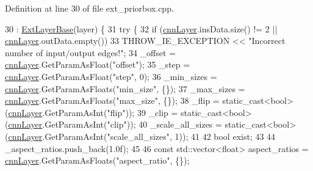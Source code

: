 Definition at line 30 of file ext\+\_\+priorbox.\+cpp.


\begin{DoxyCode}
30                                                 : \hyperlink{classInferenceEngine_1_1Extensions_1_1Cpu_1_1ExtLayerBase_affff0e8263ca26852ccf71d299d7b06a}{ExtLayerBase}(layer) \{
31         \textcolor{keywordflow}{try} \{
32             \textcolor{keywordflow}{if} (\hyperlink{classInferenceEngine_1_1Extensions_1_1Cpu_1_1ExtLayerBase_a1074cdccacb9e9ca6eec01bbc2f7ca4a}{cnnLayer}.insData.size() != 2 || \hyperlink{classInferenceEngine_1_1Extensions_1_1Cpu_1_1ExtLayerBase_a1074cdccacb9e9ca6eec01bbc2f7ca4a}{cnnLayer}.outData.empty())
33                 THROW\_IE\_EXCEPTION << \textcolor{stringliteral}{"Incorrect number of input/output edges!"};
34             \_offset = \hyperlink{classInferenceEngine_1_1Extensions_1_1Cpu_1_1ExtLayerBase_a1074cdccacb9e9ca6eec01bbc2f7ca4a}{cnnLayer}.GetParamAsFloat(\textcolor{stringliteral}{"offset"});
35             \_step = \hyperlink{classInferenceEngine_1_1Extensions_1_1Cpu_1_1ExtLayerBase_a1074cdccacb9e9ca6eec01bbc2f7ca4a}{cnnLayer}.GetParamAsFloat(\textcolor{stringliteral}{"step"}, 0);
36             \_min\_sizes = \hyperlink{classInferenceEngine_1_1Extensions_1_1Cpu_1_1ExtLayerBase_a1074cdccacb9e9ca6eec01bbc2f7ca4a}{cnnLayer}.GetParamAsFloats(\textcolor{stringliteral}{"min\_size"}, \{\});
37             \_max\_sizes = \hyperlink{classInferenceEngine_1_1Extensions_1_1Cpu_1_1ExtLayerBase_a1074cdccacb9e9ca6eec01bbc2f7ca4a}{cnnLayer}.GetParamAsFloats(\textcolor{stringliteral}{"max\_size"}, \{\});
38             \_flip = \textcolor{keyword}{static\_cast<}\textcolor{keywordtype}{bool}\textcolor{keyword}{>}(\hyperlink{classInferenceEngine_1_1Extensions_1_1Cpu_1_1ExtLayerBase_a1074cdccacb9e9ca6eec01bbc2f7ca4a}{cnnLayer}.GetParamAsInt(\textcolor{stringliteral}{"flip"}));
39             \_clip = \textcolor{keyword}{static\_cast<}\textcolor{keywordtype}{bool}\textcolor{keyword}{>}(\hyperlink{classInferenceEngine_1_1Extensions_1_1Cpu_1_1ExtLayerBase_a1074cdccacb9e9ca6eec01bbc2f7ca4a}{cnnLayer}.GetParamAsInt(\textcolor{stringliteral}{"clip"}));
40             \_scale\_all\_sizes = \textcolor{keyword}{static\_cast<}\textcolor{keywordtype}{bool}\textcolor{keyword}{>}(\hyperlink{classInferenceEngine_1_1Extensions_1_1Cpu_1_1ExtLayerBase_a1074cdccacb9e9ca6eec01bbc2f7ca4a}{cnnLayer}.GetParamAsInt(\textcolor{stringliteral}{"scale\_all\_sizes"}, 1));
41 
42             \textcolor{keywordtype}{bool} exist;
43 
44             \_aspect\_ratios.push\_back(1.0f);
45 
46             \textcolor{keyword}{const} std::vector<float> aspect\_ratios = \hyperlink{classInferenceEngine_1_1Extensions_1_1Cpu_1_1ExtLayerBase_a1074cdccacb9e9ca6eec01bbc2f7ca4a}{cnnLayer}.GetParamAsFloats(\textcolor{stringliteral}{"aspect\_ratio"}, \{\});

\end{DoxyCode}
